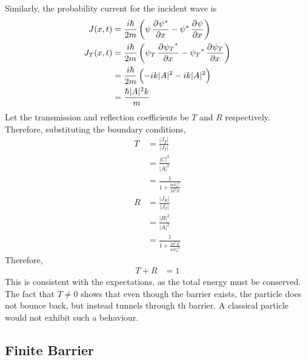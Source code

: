 \documentclass[titlepage, fleqn, a4paper, 12pt, twoside]{article}
\theoremstyle{definition}
\theoremstyle{theorem}
\let\Oldsubsection\subsection
\renewcommand{\subsection}{\FloatBarrier\Oldsubsection}
\begin{document}
Similarly, the probability current for the incident wave is
\begin{align*}
	J(x,t) &= \frac{i \hbar}{2 m} \left( \psi \dpd{\psi^*}{x} - \psi^* \dpd{\psi}{x} \right)\\
	J_T(x,t) &= \frac{i \hbar}{2 m} \left( \psi_T \dpd{{\psi_T}^*}{x} - {\psi_T}^* \dpd{\psi_T}{x} \right)\\
	&= \frac{i \hbar}{2 m} \left( -i k |A|^2 - i k |A|^2 \right)\\
	&= \frac{\hbar |A|^2 k}{m}
\end{align*}
Let the transmission and reflection coefficients be $T$ and $R$ respectively.
Therefore, substituting the boundary conditions,
\begin{align*}
	T &= \frac{|J_T|}{|J_I|}\\
	&= \frac{|C|^2}{|A|^2}\\
	&= \frac{1}{1 + \frac{m {V_0}^2}{2 \hbar^2 E}}\\
	R &= \frac{|J_R|}{|J_I|}\\
	&= \frac{|B|^2}{|A|^2}\\
	&= \frac{1}{1 + \frac{2 \hbar^2 E}{m {V_0}^2}}
\end{align*}
Therefore,
\begin{align*}
	T + R &= 1
\end{align*}
This is consistent with the expectations, as the total energy must be conserved.\\
The fact that $T \neq 0$ shows that even though the barrier exists, the particle does not bounce back, but instead tunnels through th barrier.
A classical particle would not exhibit such a behaviour.

\subsection{Finite Barrier}
\end{document}
